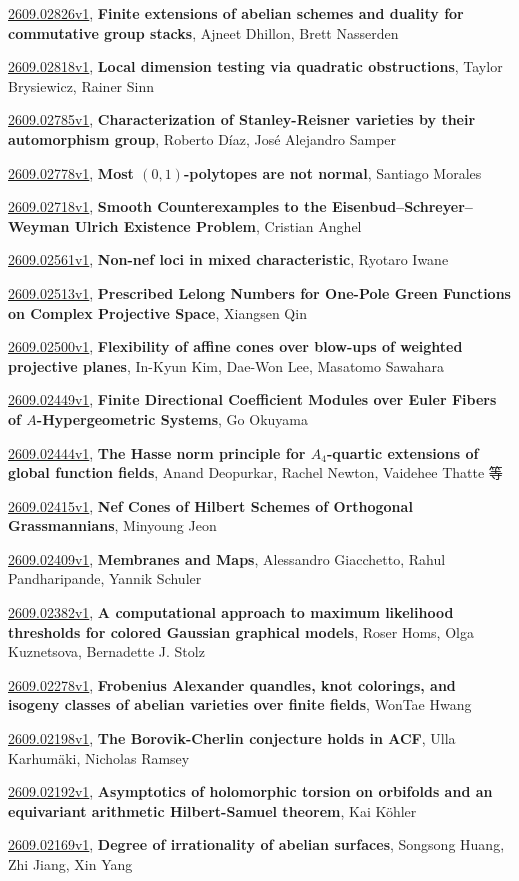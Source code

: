 \documentclass[9pt, a4paper]{article}
\theoremstyle{plain}
\theoremstyle{definition}
\theoremstyle{remark}
\newcommand{\arxiv}[3]{\href{https://arxiv.org/abs/#1}{#1}, \textbf{\textcolor{arxivblue}{#2}}, #3}
\begin{document}
\arxiv{2609.02826v1}{Finite extensions of abelian schemes and duality for commutative group stacks}{Ajneet Dhillon, Brett Nasserden}

\arxiv{2609.02818v1}{Local dimension testing via quadratic obstructions}{Taylor Brysiewicz, Rainer Sinn}

\arxiv{2609.02785v1}{Characterization of Stanley-Reisner varieties by their automorphism group}{Roberto Díaz, José Alejandro Samper}

\arxiv{2609.02778v1}{Most $(0,1)$-polytopes are not normal}{Santiago Morales}

\arxiv{2609.02718v1}{Smooth Counterexamples to the Eisenbud--Schreyer--Weyman Ulrich Existence Problem}{Cristian Anghel}

\arxiv{2609.02561v1}{Non-nef loci in mixed characteristic}{Ryotaro Iwane}

\arxiv{2609.02513v1}{Prescribed Lelong Numbers for One-Pole Green Functions on Complex Projective Space}{Xiangsen Qin}

\arxiv{2609.02500v1}{Flexibility of affine cones over blow-ups of weighted projective planes}{In-Kyun Kim, Dae-Won Lee, Masatomo Sawahara}

\arxiv{2609.02449v1}{Finite Directional Coefficient Modules over Euler Fibers of $A$-Hypergeometric Systems}{Go Okuyama}

\arxiv{2609.02444v1}{The Hasse norm principle for $A_4$-quartic extensions of global function fields}{Anand Deopurkar, Rachel Newton, Vaidehee Thatte 等}

\arxiv{2609.02415v1}{Nef Cones of Hilbert Schemes of Orthogonal Grassmannians}{Minyoung Jeon}

\arxiv{2609.02409v1}{Membranes and Maps}{Alessandro Giacchetto, Rahul Pandharipande, Yannik Schuler}

\arxiv{2609.02382v1}{A computational approach to maximum likelihood thresholds for colored Gaussian graphical models}{Roser Homs, Olga Kuznetsova, Bernadette J. Stolz}

\arxiv{2609.02278v1}{Frobenius Alexander quandles, knot colorings, and isogeny classes of abelian varieties over finite fields}{WonTae Hwang}

\arxiv{2609.02198v1}{The Borovik-Cherlin conjecture holds in ACF}{Ulla Karhumäki, Nicholas Ramsey}

\arxiv{2609.02192v1}{Asymptotics of holomorphic torsion on orbifolds and an equivariant arithmetic Hilbert-Samuel theorem}{Kai Köhler}

\arxiv{2609.02169v1}{Degree of irrationality of abelian surfaces}{Songsong Huang, Zhi Jiang, Xin Yang}
\end{document}
